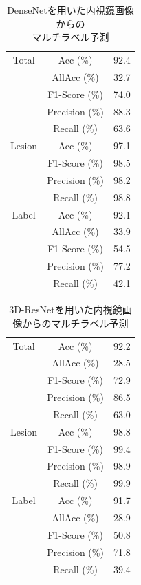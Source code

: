 \begin{table}[tb]
    \caption[]{DenseNetを用いた内視鏡画像からの\\マルチラベル予測}
    \label{tb:densenet121}
    \centering
    \normalsize
    \begin{tabular}{c|c|r} \hline
        Total & Acc (\%) & 92.4 \\ \cline{2-3}
         & AllAcc (\%) & 32.7 \\ \cline{2-3}
         & F1-Score (\%) & 74.0 \\ \cline{2-3}
         & Precision (\%) & 88.3 \\ \cline{2-3}
         & Recall (\%) & 63.6 \\ \hline
        Lesion & Acc (\%) & 97.1 \\ \cline{2-3}
         & F1-Score (\%) & 98.5 \\ \cline{2-3}
         & Precision (\%) & 98.2 \\ \cline{2-3}
         & Recall (\%) & 98.8 \\ \hline
        Label & Acc (\%) & 92.1 \\ \cline{2-3}
         & AllAcc (\%) & 33.9 \\ \cline{2-3}
         & F1-Score (\%) & 54.5 \\ \cline{2-3}
         & Precision (\%) & 77.2 \\ \cline{2-3}
         & Recall (\%) & 42.1 \\ \hline
    \end{tabular}
\end{table}

\begin{table}[tb]
    \caption[]{3D-ResNetを用いた内視鏡画像からのマルチラベル予測}
    \label{tb:1}
    \centering
    \normalsize
    \begin{tabular}{c|c|r} \hline
        Total & Acc (\%) & 92.2 \\ \cline{2-3}
         & AllAcc (\%) & 28.5 \\ \cline{2-3}
         & F1-Score (\%) & 72.9 \\ \cline{2-3}
         & Precision (\%) & 86.5 \\ \cline{2-3}
         & Recall (\%) & 63.0 \\ \hline
        Lesion & Acc (\%) & 98.8 \\ \cline{2-3}
         & F1-Score (\%) & 99.4 \\ \cline{2-3}
         & Precision (\%) & 98.9 \\ \cline{2-3}
         & Recall (\%) & 99.9 \\ \hline
        Label & Acc (\%) & 91.7 \\ \cline{2-3}
         & AllAcc (\%) & 28.9 \\ \cline{2-3}
         & F1-Score (\%) & 50.8 \\ \cline{2-3}
         & Precision (\%) & 71.8 \\ \cline{2-3}
         & Recall (\%) & 39.4 \\ \hline
    \end{tabular}
\end{table}

